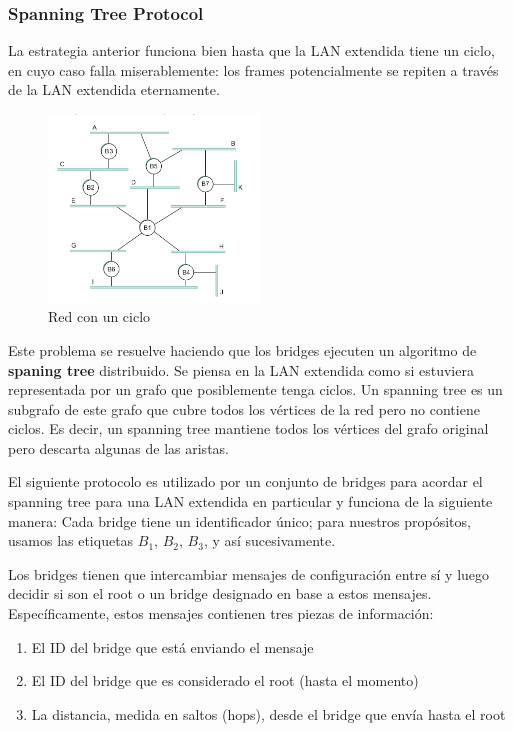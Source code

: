 \subsubsection{Spanning Tree Protocol}
La estrategia anterior funciona bien hasta que la LAN extendida tiene un ciclo, en cuyo caso falla miserablemente: los frames potencialmente se repiten a través de la LAN extendida eternamente.
\begin{figure}[H]
	\centering
	\includegraphics[width=0.5\textwidth
]{images/looped-network.png}
	\caption[Red con un ciclo]{Red con un ciclo}
	\label{fig:looped-network}
\end{figure}

Este problema se resuelve haciendo que los bridges ejecuten un algoritmo de \textbf{spaning tree} distribuido. Se piensa en la LAN extendida como si estuviera representada por un grafo que posiblemente tenga ciclos. Un spanning tree es un subgrafo de este grafo que cubre todos los vértices de la red pero no contiene ciclos. Es decir, un spanning tree mantiene todos los vértices del grafo original pero descarta algunas de las aristas.

El siguiente protocolo es utilizado por un conjunto de bridges para acordar el spanning tree para una LAN extendida en particular y funciona de la siguiente manera: Cada bridge tiene un identificador único; para nuestros propósitos, usamos las etiquetas \(B_1\), \(B_2\), \(B_3\), y así sucesivamente.

Los bridges tienen que intercambiar mensajes de configuración entre sí y luego decidir si son el root o un bridge designado en base a estos mensajes. Específicamente, estos mensajes contienen tres piezas de información:
\begin{enumerate}
  \item El ID del bridge que está enviando el mensaje
  \item El ID del bridge que es considerado el root (hasta el momento)
  \item La distancia, medida en saltos (hops), desde el bridge que envía hasta el root
\end{enumerate}

